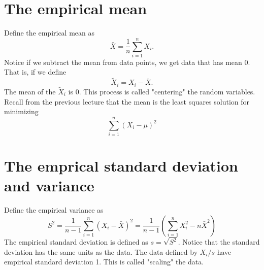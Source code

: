 \documentclass{article}
\begin{document}
\section{The empirical mean} 

Define the empirical mean as
$$
\bar X = \frac{1}{n}\sum_{i=1}^n X_i. 
$$
Notice if we subtract the mean from data points, we get data that has mean 0. That is, if we define
$$
\tilde X_i = X_i - \bar X.
$$
The mean of the $\tilde X_i$ is 0.
This process is called "centering" the random variables.
Recall from the previous lecture that the mean is the least squares solution for minimizing
$$
\sum_{i=1}^n (X_i - \mu)^2
$$


\section{The emprical standard deviation and variance}

Define the empirical variance as 
$$
S^2 = \frac{1}{n-1} \sum_{i=1}^n (X_i - \bar X)^2 
= \frac{1}{n-1} \left( \sum_{i=1}^n X_i^2 - n \bar X ^ 2 \right)
$$
The empirical standard deviation is defined as
$s = \sqrt{S^2}$. Notice that the standard deviation has the same units as the data.
The data defined by $X_i / s$ have empirical standard deviation 1. This is called "scaling" the data.
\end{document}
